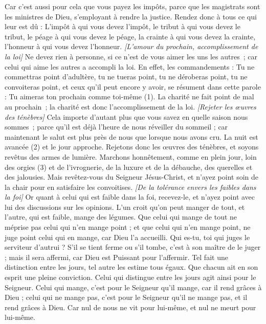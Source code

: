 \begin{multicols}{2}
Car c'est aussi pour cela que vous payez les impôts, parce que les magistrats sont les ministres de Dieu, s'employant à rendre la justice.
Rendez donc à tous ce qui leur est dû : L’impôt à qui vous devez l’impôt, le tribut à qui vous devez le tribut, le péage à qui vous devez le péage, la crainte à qui vous devez la crainte, l’honneur à qui vous devez l'honneur.
\textit{[L'amour du prochain, accomplissement de la loi]}
Ne devez rien à personne, si ce n’est de vous aimer les uns les autres ; car celui qui aime les autres a accompli la loi.
En effet, les commandements : Tu ne commettras point d’adultère, tu ne tueras point, tu ne déroberas point, tu ne convoiteras point, et ceux qu’il peut encore y avoir, se résument dans cette parole : Tu aimeras ton prochain comme toi-même (1).
La charité ne fait point de mal au prochain ; la charité est donc l'accomplissement de la loi.
\textit{[Rejeter les œuvres des ténèbres]}
Cela importe d’autant plus que vous savez en quelle saison nous sommes ; parce qu'il est déjà l’heure de nous réveiller du sommeil ; car maintenant le salut est plus près de nous que lorsque nous avons cru.
La nuit est avancée (2) et le jour approche. Rejetons donc les œuvres des ténèbres, et soyons revêtus des armes de lumière.
Marchons honnêtement, comme en plein jour, loin des orgies (3) et de l’ivrognerie, de la luxure et de la débauche, des querelles et des jalousies.
Mais revêtez-vous du Seigneur Jésus-Christ, et n'ayez point soin de la chair pour en satisfaire les convoitises.
\textit{[De la tolérance envers les faibles dans la foi]}
\VerseOne{}Or quant à celui qui est faible dans la foi, recevez-le, et n'ayez point avec lui des discussions sur les opinions.
L'un croit qu'on peut manger de tout, et l'autre, qui est faible, mange des légumes.
Que celui qui mange de tout ne méprise pas celui qui n'en mange point ; et que celui qui n'en mange point, ne juge point celui qui en mange, car Dieu l'a accueilli.
Qui es-tu, toi qui juges le serviteur d'autrui ? S’il se tient ferme ou s'il tombe, c’est à son maître de le juger ; mais il sera affermi, car Dieu est Puissant pour l'affermir.
Tel fait une distinction entre les jours, tel autre les estime tous égaux. Que chacun ait en son esprit une pleine conviction.
Celui qui distingue entre les jours agit ainsi pour le Seigneur. Celui qui mange, c’est pour le Seigneur qu’il mange, car il rend grâces à Dieu ; celui qui ne mange pas, c’est pour le Seigneur qu’il ne mange pas, et il rend grâces à Dieu.
Car nul de nous ne vit pour lui-même, et nul ne meurt pour lui-même.

\end{multicols}
